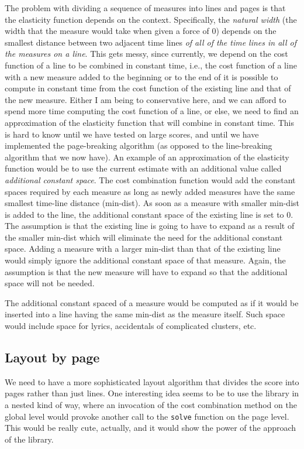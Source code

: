 The problem with dividing a sequence of measures into lines and pages
is that the elasticity function depends on the context.  Specifically,
the \emph{natural width} (the width that the measure would take when
given a force of 0) depends on the smallest distance between two
adjacent time lines \emph{of all of the time lines in all of the
measures on a line}.  This gets messy, since currently, we depend on
the cost function of a line to be combined in constant time, i.e., the
cost function of a line with a new measure added to the beginning or
to the end of it is possible to compute in constant time from the cost
function of the existing line and that of the new measure.  Either I
am being to conservative here, and we can afford to spend more time
computing the cost function of a line, or else, we need to find an
approximation of the elasticity function that will combine in constant
time.  This is hard to know until we have tested {\gs} on large
scores, and until we have implemented the page-breaking algorithm (as
opposed to the line-breaking algorithm that we now have). An example
of an approximation of the elasticity function would be to use the
current estimate with an additional value called \emph{additional
constant space}.  The cost combination function would add the constant
spaces required by each measure as long as newly added measures have
the same smallest time-line distance (min-dist).  As soon as a measure
with smaller min-dist is added to the line, the additional constant
space of the existing line is set to 0.  The assumption is that the
existing line is going to have to expand as a result of the smaller
min-dist which will eliminate the need for the additional constant
space.  Adding a measure with a larger min-dist than that of the
existing line would simply ignore the additional constant space of
that measure.  Again, the assumption is that the new measure will have
to expand so that the additional space will not be needed.

The additional constant spaced of a measure would be computed as if it
would be inserted into a line having the same min-dist as the measure
itself.  Such space would include space for lyrics, accidentals of
complicated clusters, etc. 

\subsection{Layout by page}

We need to have a more sophisticated layout algorithm that divides the
score into pages rather than just lines.  One interesting idea seems
to be to use the {\obseq} library in a nested kind of way, where an
invocation of the cost combination method on the global level would
provoke another call to the \texttt{solve} function on the page
level.  This would be really cute, actually, and it would show the
power of the approach of the {\obseq} library.  

